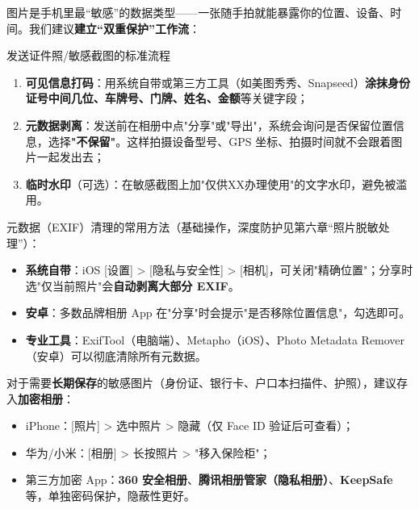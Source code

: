 
图片是手机里最“敏感”的数据类型——一张随手拍就能暴露你的位置、设备、时间。我们建议\textbf{建立“双重保护”工作流}：

\begin{tcbwarn}{发送证件照/敏感截图的标准流程}
\begin{enumerate}
  \item \textbf{可见信息打码}：用系统自带或第三方工具（如美图秀秀、Snapseed）\textbf{涂抹身份证号中间几位、车牌号、门牌、姓名、金额}等关键字段；
  \item \textbf{元数据剥离}：发送前在相册中点"分享"或"导出"，系统会询问是否保留位置信息，选择\textbf{"不保留"}。这样拍摄设备型号、GPS 坐标、拍摄时间就不会跟着图片一起发出去；
  \item \textbf{临时水印}（可选）：在敏感截图上加"仅供XX办理使用"的文字水印，避免被滥用。
\end{enumerate}

\end{tcbwarn}

元数据（EXIF）清理的常用方法（基础操作，深度防护见第六章“照片脱敏处理”）：

\begin{itemize}
  \item \textbf{系统自带}：iOS [设置] > [隐私与安全性] > [相机]，可关闭"精确位置"；分享时选"仅当前照片"会\textbf{自动剥离大部分 EXIF}。
  \item \textbf{安卓}：多数品牌相册 App 在"分享"时会提示"是否移除位置信息"，勾选即可。
  \item \textbf{专业工具}：ExifTool（电脑端）、Metapho（iOS）、Photo Metadata Remover（安卓）可以彻底清除所有元数据。
\end{itemize}

对于需要\textbf{长期保存}的敏感图片（身份证、银行卡、户口本扫描件、护照），建议存入\textbf{加密相册}：

\begin{itemize}
  \item iPhone：[照片] > 选中照片 > 隐藏（仅 Face ID 验证后可查看）；
  \item 华为/小米：[相册] > 长按照片 > "移入保险柜"；
  \item 第三方加密 App：\textbf{360 安全相册}、\textbf{腾讯相册管家（隐私相册）}、\textbf{KeepSafe}等，单独密码保护，隐蔽性更好。
\end{itemize}
